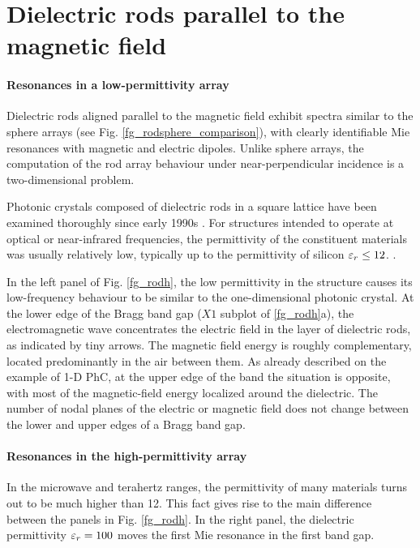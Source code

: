 %   
\FloatBarrier %
\section{Dielectric rods parallel to the magnetic field} %
\paragraph{Resonances in a low-permittivity array}	\label{sect_diel_rods_mag}	%
Dielectric rods aligned parallel to the magnetic field exhibit spectra similar to the sphere arrays (see Fig. \ref{fg_rodsphere_comparison}), with clearly identifiable Mie resonances with magnetic and electric dipoles.
Unlike sphere arrays, the computation of the rod array behaviour under near-perpendicular incidence is a two-dimensional problem. 

Photonic crystals composed of dielectric rods in a square lattice have been examined thoroughly since early 1990s \cite{plihal1991two, pendry1992_transfer_matrix}. For structures intended to operate at optical or near-infrared frequencies, the permittivity of the constituent materials was usually relatively low, typically up to the permittivity of silicon $\varepsilon_r \leq 12$. . 

In the left panel of Fig. \ref{fg_rodh}, the low permittivity in the structure causes its low-frequency behaviour to be similar to the one-dimensional photonic crystal. At the lower edge of the Bragg band gap ($X1$ subplot of \ref{fg_rodh}a), the electromagnetic wave concentrates the electric field in the layer of dielectric rods, as indicated by tiny arrows. The magnetic field energy is roughly complementary, located predominantly in the air between them. As already described on the example of 1-D PhC, at the upper edge of the band the situation is opposite, with most of the magnetic-field energy localized around the dielectric. The number of nodal planes of the electric or magnetic field does not change between the lower and upper edges of a Bragg band gap.

\paragraph{Resonances in the high-permittivity array} %
In the microwave and terahertz ranges, the permittivity of many materials turns out to be much higher than 12. This fact gives rise to the main difference between the panels in Fig. \ref{fg_rodh}. In the right panel, the dielectric permittivity $\varepsilon_r=100$ moves the first Mie resonance \cite{obrien2002photonic} in the first band gap. 

